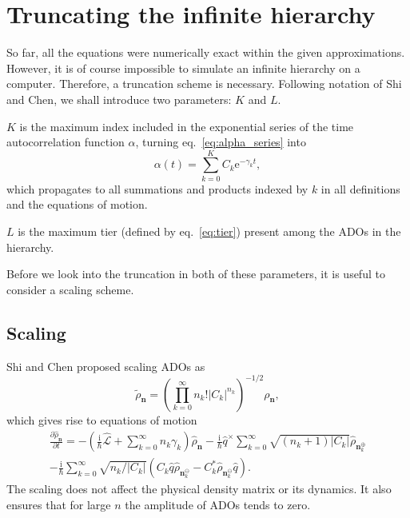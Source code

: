 \section{Truncating the infinite hierarchy}\label{sec:truncation}
So far, all the equations were numerically exact within the given approximations. However, it is of course impossible to simulate an infinite hierarchy on a computer. Therefore, a truncation scheme is necessary. Following notation of Shi and Chen\supercite{Shi2009a,Chen2009a}, we shall introduce two parameters: $K$ and $L$.

$K$ is the maximum index included in the exponential series of the time autocorrelation function $\alpha$, turning eq.~\ref{eq:alpha_series} into
\begin{equation}
\alpha(t) = \sum_{k=0}^{K} C_k \mathrm{e}^{-\gamma_k t},
\end{equation}
which propagates to all summations and products indexed by $k$ in all definitions and the equations of motion.

$L$ is the maximum tier (defined by eq.~\ref{eq:tier}) present among the ADOs in the hierarchy.

Before we look into the truncation in both of these parameters, it is useful to consider a scaling scheme.

\subsection{Scaling} \label{subsec:scaling}
Shi and Chen\supercite{Shi2009a,Chen2009a} proposed scaling ADOs as
\begin{equation}
\tilde{\rho}_{\bm{n}} = \left(\prod_{k=0}^{\infty}n_k!|C_k|^{n_k}\right)^{-1/2}\rho_{\bm{n}},
\end{equation}
which gives rise to equations of motion
\begin{multline}
\frac{\partial \hat{\rho}_{\bm{n}} }{\partial t} =
-\left(\frac{\mathrm{i}}{\hbar}\hat{\mathcal{L}}+\sum_{k=0}^{\infty}n_k \gamma_k \right)\hat{\rho}_{\bm{n}}
-\frac{\mathrm{i}}{\hbar}\hat{q}^\times
\sum_{k=0}^{\infty}
\sqrt{(n_k+1)|C_k|}
\hat{\rho}_{\bm{n}_k^\oplus} \\
-\frac{\mathrm{i}}{\hbar}\sum_{k=0}^{\infty}
\sqrt{n_k/|C_k|}
\left(C_k\hat{q}\hat{\rho}_{\bm{n}_k^\ominus}-C_k^*\hat{\rho}_{\bm{n}_k^\ominus}\hat{q}\right).
\end{multline}
The scaling does not affect the physical density matrix or its dynamics. It also ensures that for large $n$ the amplitude of ADOs tends to zero.

